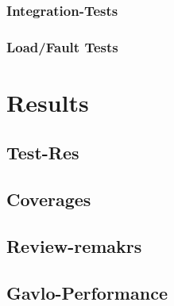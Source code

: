 \documentclass[master,english,smartquotes,apa]{hgbthesis}
\begin{document}
			\subsection{Integration-Tests}
			\subsection{Load/Fault Tests}
			
		
	\chapter{Results}
	\label{cha:Results}
		\section{Test-Res}
		\section{Coverages}
		\section{Review-remakrs}
		\section{Gavlo-Performance}



% 
% 
% 
% 
% 

\appendix                                                             %


\backmatter                           %

\MakeBibliography %


% 

\end{document}
